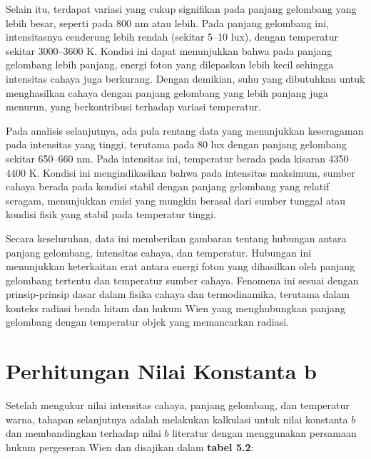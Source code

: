 Selain itu, terdapat variasi yang cukup signifikan pada panjang gelombang yang lebih besar, seperti pada 800 nm atau lebih. Pada panjang gelombang ini, intensitasnya cenderung lebih rendah (sekitar 5–10 lux), dengan temperatur sekitar 3000–3600 K. Kondisi ini dapat menunjukkan bahwa pada panjang gelombang lebih panjang, energi foton yang dilepaskan lebih kecil sehingga intensitas cahaya juga berkurang. Dengan demikian, suhu yang dibutuhkan untuk menghasilkan cahaya dengan panjang gelombang yang lebih panjang juga menurun, yang berkontribusi terhadap variasi temperatur.

Pada analisis selanjutnya, ada pula rentang data yang menunjukkan keseragaman pada intensitas yang tinggi, terutama pada 80 lux dengan panjang gelombang sekitar 650–660 nm. Pada intensitas ini, temperatur berada pada kisaran 4350–4400 K. Kondisi ini mengindikasikan bahwa pada intensitas maksimum, sumber cahaya berada pada kondisi stabil dengan panjang gelombang yang relatif seragam, menunjukkan emisi yang mungkin berasal dari sumber tunggal atau kondisi fisik yang stabil pada temperatur tinggi.

Secara keseluruhan, data ini memberikan gambaran tentang hubungan antara panjang gelombang, intensitas cahaya, dan temperatur. Hubungan ini menunjukkan keterkaitan erat antara energi foton yang dihasilkan oleh panjang gelombang tertentu dan temperatur sumber cahaya. Fenomena ini sesuai dengan prinsip-prinsip dasar dalam fisika cahaya dan termodinamika, terutama dalam konteks radiasi benda hitam dan hukum Wien yang menghubungkan panjang gelombang dengan temperatur objek yang memancarkan radiasi.

\section{Perhitungan Nilai Konstanta b}
Setelah mengukur nilai intensitas cahaya, panjang gelombang, dan temperatur warna, tahapan selanjutnya adalah melakukan kalkulasi untuk nilai konstanta $b$ dan membandingkan terhadap nilai $b$ literatur dengan menggunakan persamaan hukum pergeseran Wien dan disajikan dalam \textbf{tabel 5.2}:

